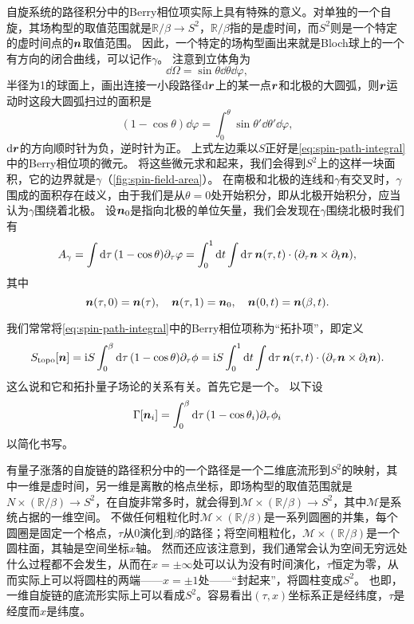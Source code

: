 自旋系统的路径积分中的Berry相位项实际上具有特殊的意义。对单独的一个自旋，其场构型的取值范围就是$\mathbb{R} / \beta \rightarrow S^2$，$\mathbb{R} / \beta$指的是虚时间，而$S^2$则是一个特定的虚时间点的$\vb*{n}$取值范围。
因此，一个特定的场构型画出来就是Bloch球上的一个有方向的闭合曲线，可以记作$\gamma$。
注意到立体角为
\[
    \dd{\Omega} = \sin \theta \dd{\theta} \dd{\varphi},
\]
半径为1的球面上，画出连接一小段路径$\dd{\vb*{r}}$上的某一点$\vb*{r}$和北极的大圆弧，则$\vb*{r}$运动时这段大圆弧扫过的面积是
\[
    (1 - \cos \theta) \dd{\varphi} = \int_0^\theta \sin \theta' \dd{\theta'} \dd{\varphi},
\]
$\dd{\vb*{r}}$的方向顺时针为负，逆时针为正。
上式左边乘以$S$正好是\eqref{eq:spin-path-integral}中的Berry相位项的微元。
将这些微元求和起来，我们会得到$S^2$上的这样一块面积，它的边界就是$\gamma$（\autoref{fig:spin-field-area}）。
在南极和北极的连线和$\gamma$有交叉时，$\gamma$围成的面积存在歧义，由于我们是从$\theta=0$处开始积分，即从北极开始积分，应当认为$\gamma$围绕着北极。
设$\vb*{n}_0$是指向北极的单位矢量，我们会发现在$\gamma$围绕北极时我们有
\begin{equation}
    A_\gamma = \int \dd{\tau} (1 - \cos \theta) \partial_\tau \varphi = \int_0^1 \dd{t} \int \dd{\tau} \vb*{n}(\tau, t) \cdot (\partial_\tau \vb*{n} \times \partial_t \vb*{n}), 
\end{equation}
其中
\begin{equation}
    \vb*{n}(\tau, 0) = \vb*{n}(\tau), \quad \vb*{n}(\tau, 1) = \vb*{n}_0, \quad \vb*{n}(0, t) = \vb*{n}(\beta, t).
\end{equation}

我们常常将\eqref{eq:spin-path-integral}中的Berry相位项称为“拓扑项”，即定义
\begin{equation}
    S_\text{topo}[\vb*{n}] = \mathrm{i} S \int_0^\beta \dd{\tau} (1 - \cos \theta) \partial_\tau \phi = \mathrm{i} S \int_0^1 \dd{t} \int \dd{\tau} \vb*{n}(\tau, t) \cdot (\partial_\tau \vb*{n} \times \partial_t \vb*{n}).
    \label{eq:single-spin-topo-term}
\end{equation}
这么说和它和拓扑量子场论的关系有关。首先它是一个。 %
以下设
\begin{equation}
    \Gamma[\vb*{n}_i] = \int_0^\beta \dd{\tau} (1- \cos \theta_i) \partial_\tau \phi_i
\end{equation}
以简化书写。

有量子涨落的自旋链的路径积分中的一个路径是一个二维底流形到$S^2$的映射，其中一维是虚时间，另一维是离散的格点坐标，即场构型的取值范围就是$N \times (\mathbb{R} / \beta) \to S^2$，在自旋非常多时，就会得到$\mathcal{M} \times (\mathbb{R} / \beta) \to S^2$，其中$\mathcal{M}$是系统占据的一维空间。
不做任何粗粒化时$\mathcal{M} \times (\mathbb{R} / \beta)$是一系列圆圈的并集，每个圆圈是固定一个格点，$\tau$从$0$演化到$\beta$的路径；将空间粗粒化，$\mathcal{M} \times (\mathbb{R} / \beta)$是一个圆柱面，其轴是空间坐标$x$轴。
然而还应该注意到，我们通常会认为空间无穷远处什么过程都不会发生，从而在$x = \pm \infty$处可以认为没有时间演化，$\tau$恒定为零，从而实际上可以将圆柱的两端——$x = \pm 1$处——“封起来”，将圆柱变成$S^2$。
也即，一维自旋链的底流形实际上可以看成$S^2$。容易看出$(\tau, x)$坐标系正是经纬度，$\tau$是经度而$x$是纬度。

